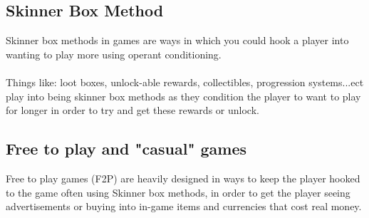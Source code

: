 \documentclass{scrartcl}
\begin{document}
\subsection{Skinner Box Method}
Skinner box methods in games are ways in which you could hook a player into wanting to play more using operant conditioning. \cite{SkinnerBox}
\\
\\
Things like: loot boxes, unlock-able rewards, collectibles, progression systems...ect play into being skinner box methods as they condition the player to want to play for longer in order to try and get these rewards or unlock.
\cite{AddictiveDesign4}

\subsection{Free to play and "casual" games}
Free to play games (F2P) are heavily designed in ways to keep the player hooked to the game often using Skinner box methods, in order to get the player seeing advertisements or buying into in-game items and currencies that cost real money.\cite{FreeToPlay} \cite{Ethics2}
\end{document}
